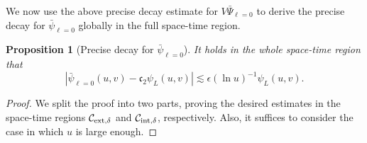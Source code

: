 \documentclass[a4paper,reqno]{amsart}
\newtheorem{proposition}[theorem]{Proposition}
\theoremstyle{definition}
\numberwithin{equation}{section}
\def\ep{\epsilon}
\begin{document}
We now use the above precise decay estimate for $V\bar{\Psi}_{\ell=0}$ to derive the precise decay for $\bar{\psi}_{\ell=0}$ globally in the full space-time region.

\begin{proposition}
[Precise decay for $\bar{\psi}_{\ell=0}$] \label{Prop:pointpsi0}
It holds in the whole space-time region that
\begin{equation}\label{est:pointpsi0}
\left|\bar{\psi}_{\ell=0}(u,v)-\mathfrak{c}_{2}\psi_{L}(u,v)\right|\lesssim  \ep(\ln u)^{-1}\psi_{L}(u,v).
\end{equation}
\end{proposition}

\begin{proof}
We split the proof into two parts, proving the desired estimates in the space-time regions $\mathcal{C}_{{\rm{ext}},\delta}$ and $\mathcal{C}_{{\rm{int}},\delta}$, respectively. Also, it suffices to consider the case in which $u$ is large enough.


\end{proof}
\end{document}

